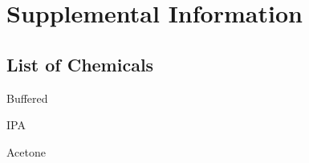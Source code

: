 \chapter{Supplemental Information}
\label{chap:appendix}
\thispagestyle{empty}


\section{List of Chemicals}
\label{sup:LoChemicals}





Buffered 





IPA

Acetone


